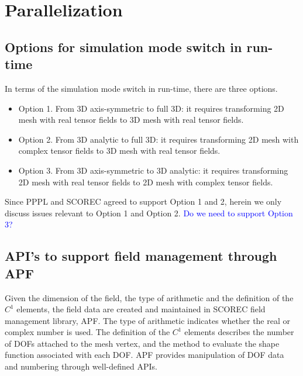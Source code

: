 \documentclass[11pt]{article}  %
\begin{document}
\section{Parallelization} \label{sec:issues}

\subsection{Options for simulation mode switch in run-time}

In terms of the simulation mode switch in run-time, there are three options.
\begin{itemize} 
\item{Option 1.} From 3D axis-symmetric to full 3D: it requires transforming 2D mesh with real tensor fields to 3D mesh with real tensor fields. 
\item{Option 2.} From 3D analytic to full 3D: it requires transforming 2D mesh with complex tensor fields to 3D mesh with real tensor fields.
\item{Option 3.} From 3D axis-symmetric to 3D analytic: it requires transforming 2D mesh with real tensor fields to 2D mesh with complex tensor fields. 
\end{itemize} 

Since PPPL and SCOREC agreed to support Option 1 and 2, herein we only discuss issues relevant to Option 1 and Option 2. \textcolor{blue}{Do we need to support Option 3?}

\subsection{API's to support field management through APF}

Given the dimension of the field, the type of arithmetic and the definition of the $C^1$ elements, the field data are created and maintained in SCOREC field management library, APF.  The type of arithmetic indicates whether the real or complex number is used. The definition of the $C^1$ elements describes the number of DOFs attached to the mesh vertex, and the method to evaluate the shape function associated with each DOF. APF provides manipulation of DOF data and numbering through well-defined APIs.

\end{document}
